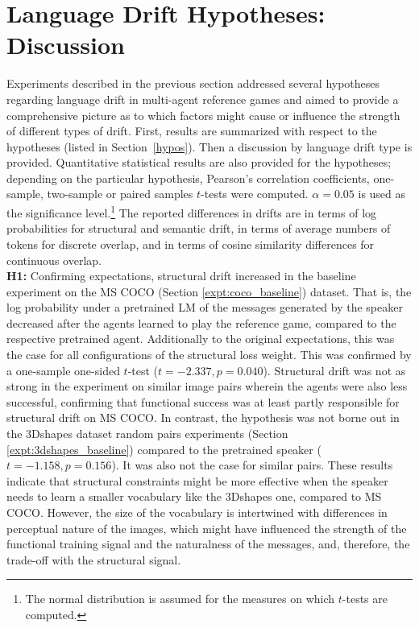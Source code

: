 \section{Language Drift Hypotheses: Discussion}
\label{hypos_discussion}
Experiments described in the previous section addressed several hypotheses regarding language drift in multi-agent reference games and aimed to provide a comprehensive picture as to which factors might cause or influence the strength of different types of drift.
First, results are summarized with respect to the hypotheses (listed in Section~\ref{hypos}). Then a discussion by language drift type is provided. Quantitative statistical results are also provided for the hypotheses; depending on the particular hypothesis, Pearson's correlation coefficients, one-sample, two-sample or paired samples $t$-tests were computed. $\alpha=0.05$ is used as the significance level.\footnote{The normal distribution is assumed for the measures on which $t$-tests are computed.} The reported differences in drifts are in terms of log probabilities for structural and semantic drift, in terms of average numbers of tokens for discrete overlap, and in terms of cosine similarity differences for continuous overlap. \\
\newline
\textbf{H1:} Confirming expectations, structural drift increased in the baseline experiment on the MS COCO (Section \ref{expt:coco_baseline}) dataset. That is, the log probability under a pretrained LM of the messages generated by the speaker decreased after the agents learned to play the reference game, compared to the respective pretrained agent. Additionally to the original expectations, this was the case for all configurations of the structural loss weight. This was confirmed by a one-sample one-sided $t$-test ($t = -2.337, p = 0.040$). Structural drift was not as strong in the experiment on similar image pairs wherein the agents were also less successful, confirming that functional success was at least partly responsible for structural drift on MS COCO.
In contrast, the hypothesis was not borne out in the 3Dshapes dataset random pairs experiments (Section \ref{expt:3dshapes_baseline}) compared to the pretrained speaker ($t = -1.158, p = 0.156$). It was also not the case for similar pairs.%
These results indicate that structural constraints might be more effective when the speaker needs to learn a smaller vocabulary like the 3Dshapes one, compared to MS COCO. However, the size of the vocabulary is intertwined with differences in perceptual nature of the images, which might have influenced the strength of the functional training signal and the naturalness of the messages, and, therefore, the trade-off with the structural signal.\newline
